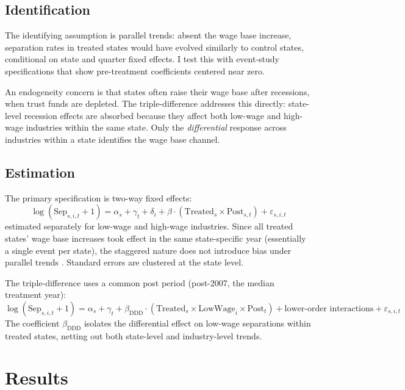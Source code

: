 \documentclass[12pt]{article}
\begin{document}
\subsection{Identification}

The identifying assumption is parallel trends: absent the wage base increase, separation rates in treated states would have evolved similarly to control states, conditional on state and quarter fixed effects. I test this with event-study specifications that show pre-treatment coefficients centered near zero.

An endogeneity concern is that states often raise their wage base after recessions, when trust funds are depleted. The triple-difference addresses this directly: state-level recession effects are absorbed because they affect both low-wage and high-wage industries within the same state. Only the \textit{differential} response across industries within a state identifies the wage base channel.

\subsection{Estimation}

The primary specification is two-way fixed effects:
\begin{equation}
\log(\text{Sep}_{s,i,t} + 1) = \alpha_s + \gamma_t + \delta_i + \beta \cdot (\text{Treated}_s \times \text{Post}_{s,t}) + \varepsilon_{s,i,t}
\end{equation}
estimated separately for low-wage and high-wage industries. Since all treated states' wage base increases took effect in the same state-specific year (essentially a single event per state), the staggered nature does not introduce bias under parallel trends \citep{goodmanbacon2021}. Standard errors are clustered at the state level.

The triple-difference uses a common post period (post-2007, the median treatment year):
\begin{equation}
\log(\text{Sep}_{s,i,t} + 1) = \alpha_s + \gamma_t + \beta_{\text{DDD}} \cdot (\text{Treated}_s \times \text{LowWage}_i \times \text{Post}_t) + \text{lower-order interactions} + \varepsilon_{s,i,t}
\end{equation}
The coefficient $\beta_{\text{DDD}}$ isolates the differential effect on low-wage separations within treated states, netting out both state-level and industry-level trends.


\section{Results}
\end{document}
